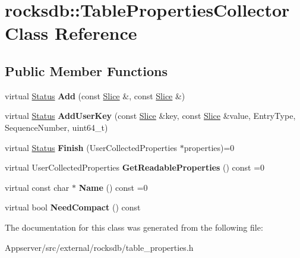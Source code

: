\hypertarget{classrocksdb_1_1TablePropertiesCollector}{}\section{rocksdb\+:\+:Table\+Properties\+Collector Class Reference}
\label{classrocksdb_1_1TablePropertiesCollector}
\subsection*{Public Member Functions}
\begin{DoxyCompactItemize}
\item 
virtual \hyperlink{classrocksdb_1_1Status}{Status} {\bfseries Add} (const \hyperlink{classrocksdb_1_1Slice}{Slice} \&, const \hyperlink{classrocksdb_1_1Slice}{Slice} \&)\hypertarget{classrocksdb_1_1TablePropertiesCollector_aa7c608eec5b5c1f44d188fdba18f363b}{}\label{classrocksdb_1_1TablePropertiesCollector_aa7c608eec5b5c1f44d188fdba18f363b}

\item 
virtual \hyperlink{classrocksdb_1_1Status}{Status} {\bfseries Add\+User\+Key} (const \hyperlink{classrocksdb_1_1Slice}{Slice} \&key, const \hyperlink{classrocksdb_1_1Slice}{Slice} \&value, Entry\+Type, Sequence\+Number, uint64\+\_\+t)\hypertarget{classrocksdb_1_1TablePropertiesCollector_ab35420e88794ed8cfc6499a5b18c0db4}{}\label{classrocksdb_1_1TablePropertiesCollector_ab35420e88794ed8cfc6499a5b18c0db4}

\item 
virtual \hyperlink{classrocksdb_1_1Status}{Status} {\bfseries Finish} (User\+Collected\+Properties $\ast$properties)=0\hypertarget{classrocksdb_1_1TablePropertiesCollector_a9bdd727c1041b033ce0e2c1868a4b3ae}{}\label{classrocksdb_1_1TablePropertiesCollector_a9bdd727c1041b033ce0e2c1868a4b3ae}

\item 
virtual User\+Collected\+Properties {\bfseries Get\+Readable\+Properties} () const =0\hypertarget{classrocksdb_1_1TablePropertiesCollector_a29cdbdf4719e1e42093d0df9e1693310}{}\label{classrocksdb_1_1TablePropertiesCollector_a29cdbdf4719e1e42093d0df9e1693310}

\item 
virtual const char $\ast$ {\bfseries Name} () const =0\hypertarget{classrocksdb_1_1TablePropertiesCollector_aa1e7087bd3b18c3b2255ba72ce5be5a6}{}\label{classrocksdb_1_1TablePropertiesCollector_aa1e7087bd3b18c3b2255ba72ce5be5a6}

\item 
virtual bool {\bfseries Need\+Compact} () const\hypertarget{classrocksdb_1_1TablePropertiesCollector_aa799c1c9dd55f7b2b634b2eb1e99df18}{}\label{classrocksdb_1_1TablePropertiesCollector_aa799c1c9dd55f7b2b634b2eb1e99df18}

\end{DoxyCompactItemize}


The documentation for this class was generated from the following file\+:\begin{DoxyCompactItemize}
\item 
Appserver/src/external/rocksdb/table\+\_\+properties.\+h\end{DoxyCompactItemize}
